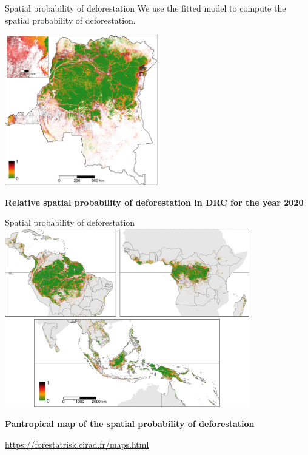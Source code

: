 \documentclass[10pt,table,dvipsnames,compress]{beamer}
\begin{document}
\begin{frame}[label={sec:org0b59176}]{Spatial probability of deforestation}
We use the fitted model to compute the spatial probability of
deforestation.

\centering \includegraphics[width=0.5\textwidth]{figs/sm/prob.png}

\textbf{Relative spatial probability of deforestation in DRC for the year 2020}
\end{frame}

\begin{frame}[label={sec:orgc83c538}]{Spatial probability of deforestation}
\centering \includegraphics[width=0.8\textwidth]{figs/article/prob}

\textbf{Pantropical map of the spatial probability of deforestation}

\url{https://forestatrisk.cirad.fr/maps.html}
\end{frame}
\end{document}
